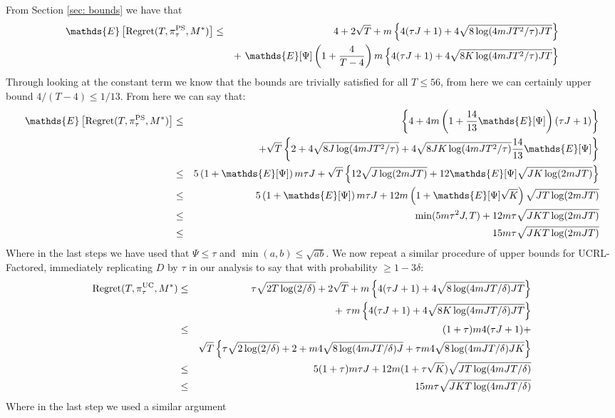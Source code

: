 \documentclass{article}
\newcommand{\Exp}{\mathds{E}}
\begin{document}
From Section \ref{sec: bounds} we have that
\begin{eqnarray*}
	\Exp \left[\mathrm{Regret}(T, \pi^{\rm PS}_{\tau}, M^*) \right] &\le& 4 +2 \sqrt{T} +
		m \left\{ 4(\tau J + 1) + 4\sqrt{8 \log(4mJ T^2/\tau) J T} \right\} \\
		&&+ \  \Exp[\Psi]\left(1 + \frac{4}{T-4}\right) m \left\{ 4(\tau J + 1) + 4\sqrt{8 K \log(4mJ T^2 / \tau) J T} \right\}
\end{eqnarray*}
Through looking at the constant term we know that the bounds are trivially satisfied for all $T\le 56$, from here we can certainly upper bound $4/(T-4) \le 1/13$.
From here we can say that:
\begin{eqnarray*}
	\Exp \left[\mathrm{Regret}(T, \pi^{\rm PS}_{\tau}, M^*) \right] &\le& \left\{ 4 + 4m\left(1 + \frac{14}{13} \Exp[\Psi]\right)(\tau J +1) \right\} \\
		&& + \sqrt{T} \left\{ 2 + 4\sqrt{8J \log(4mJ T^2/\tau)} + 4\sqrt{8 JK \log(4mJ T^2/\tau)} \frac{14}{13} \Exp[\Psi] \right\} \\
	&\le& 5 \left( 1 + \Exp[\Psi] \right) m \tau J + \sqrt{T} \left\{ 12\sqrt{J\log(2mJ T)} + 12\Exp[\Psi] \sqrt{JK\log(2mJ T)} \right\} \\
	&\le& 5 \left( 1 + \Exp[\Psi] \right) m \tau J + 12m\left( 1 + \Exp[ \Psi] \sqrt{K} \right) \sqrt{J T\log(2mJ T)} \\
	&\le& \min(5 m \tau^2 J, T) + 12m \tau \sqrt{J K T \log(2mJ T)} \\
	&\le& 15m \tau \sqrt{J K T \log(2mJ T)}
\end{eqnarray*}
Where in the last steps we have used that $\Psi \le \tau$ and $\min(a,b) \le \sqrt{ab}$.
We now repeat a similar procedure of upper bounds for UCRL-Factored, immediately replicating $D$ by $\tau$ in our analysis to say that with probability $\ge 1- 3\delta$:
\begin{eqnarray*}
	\mathrm{Regret}(T, \pi^{\rm UC}_{\tau}, M^*) &\le& \tau \sqrt{2T \log(2/\delta)} + 2\sqrt{T} +
		m \left\{ 4(\tau J + 1) + 4\sqrt{8 \log(4mJ T/\delta) J T} \right\} \\
		&&+ \  \tau m \left\{ 4(\tau J + 1) + 4\sqrt{8 K \log(4mJ T / \delta) J T} \right\}\\
		&\le& (1+\tau)m4(\tau J + 1) + \\
		  &&\sqrt{T} \left\{ \tau \sqrt{2 \log(2/\delta)} + 2 +  m4\sqrt{8 \log(4mJ T / \delta) J} + \tau m 4 \sqrt{8 \log(4mJ T / \delta) JK} \right\} \\
		&\le& 5(1+\tau)m\tau J + 12m(1 + \tau \sqrt{K}) \sqrt{J T \log(4mJT / \delta)} \\
		&\le& 15m \tau \sqrt{J K T \log(4mJ T / \delta)}
\end{eqnarray*}
Where in the last step we used a similar argument

\end{document}

